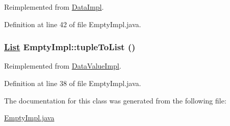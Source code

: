 Reimplemented from \hyperlink{classDataImpl_a6}{Data\-Impl}.

Definition at line 42 of file Empty\-Impl.java.\hypertarget{classEmptyImpl_a3}{
\subsubsection[tupleToList]{\setlength{\rightskip}{0pt plus 5cm}\hyperlink{interfaceList}{List} Empty\-Impl::tuple\-To\-List ()}}
\label{classEmptyImpl_a3}




Reimplemented from \hyperlink{classDataValueImpl_a2}{Data\-Value\-Impl}.

Definition at line 38 of file Empty\-Impl.java.

The documentation for this class was generated from the following file:\begin{CompactItemize}
\item 
\hyperlink{EmptyImpl_8java-source}{Empty\-Impl.java}\end{CompactItemize}
